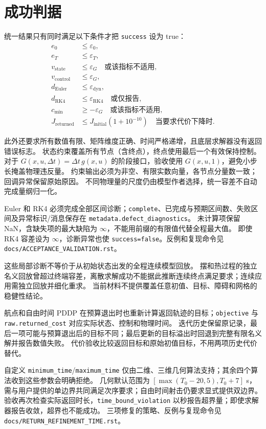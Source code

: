 \documentclass[UTF8,zihao=-4,openany,fontset=fandol]{ctexbook}
\newcommand{\code}[1]{\nolinkurl{#1}}
\begin{document}
\section{成功判据}

统一结果只有同时满足以下条件才把 \code{success} 设为 true：
\begin{align}
  e_0 &\le \varepsilon_0,\\
  e_T &\le \varepsilon_T,\\
  v_{\mathrm{state}} &\le \varepsilon_G
  \quad\text{或该指标不适用},\\
  v_{\mathrm{control}} &\le \varepsilon_G,\\
  d_{\mathrm{Euler}} &\le \varepsilon_{\mathrm{dyn}},\\
  d_{\mathrm{RK4}} &\le \varepsilon_{\mathrm{RK4}}
  \quad\text{或仅报告},\\
  c_{\min} &\ge-\varepsilon_G
  \quad\text{或该指标不适用},\\
  J_{\mathrm{returned}}&\le J_{\mathrm{initial}}(1+10^{-10})
  \quad\text{当要求代价下降时}.
\end{align}

此外还要求所有数值有限、矩阵维度正确、时间严格递增，且底层求解器没有返回错误标志。
状态约束覆盖所有节点（含终点），终点使用最后一个有效保持控制。
对于 $G(x,u,\Delta t)=\Delta t\,g(x,u)$ 的阶段接口，验收使用 $G(x,u,1)$，避免小步长掩盖物理违反量。
约束输出必须为非空、有限实数向量，各节点分量数一致；回调异常保留原始原因。
不同物理量的尺度仍由模型作者选择，统一容差不自动完成量纲归一化。

Euler 和 RK4 必须完成全部区间诊断；\code{complete}、已完成与预期区间数、失败区间及异常标识/消息保存在 \code{metadata.defect_diagnostics}。
未计算项保留 NaN，含缺失项的最大缺陷为 $\infty$，不能用前缀的有限值代替全程最大值。
即使 RK4 容差设为 $\infty$，诊断异常也使 \code{success=false}。反例和复现命令见 \code{docs/ACCEPTANCE_VALIDATION.rst}。

这些局部诊断不等价于从初始状态出发的全程连续模型回放。
摆和热过程的独立名义回放曾超过终端容差，离散求解成功不能据此推断连续终点满足要求；连续应用需独立回放并细化重求。
当前材料不提供覆盖任意初值、目标、障碍和网格的稳健性结论。

航点和自由时间 PDDP 在预算退出时也重新计算返回轨迹的目标；\code{objective} 与 \code{raw.returned_cost} 对应实际状态、控制和物理时间。
迭代历史保留原记录，最后一项可能与预算退出后的目标不同；最后更新的目标溢出时回退到完整有限名义解并报告数值失败。
代价验收比较返回目标和原始初值目标，不用两项历史代价替代。

自定义 \code{minimum_time}/\code{maximum_time} 仅由二维、三维几何算法支持；其余四个算法收到这些参数会明确拒绝。
几何默认范围为 $[\max(T_0-20,5),T_0+7]$ s，需与用户提供的单边界共同满足次序要求；自由时间射击仍要求显式提供双边界。
验收再次检查实际返回时长，\code{time_bound_violation} 以秒报告超界量；即使求解器报告收敛，超界也不能成功。
三项修复的策略、反例与复现命令见 \code{docs/RETURN_REFINEMENT_TIME.rst}。
\end{document}
